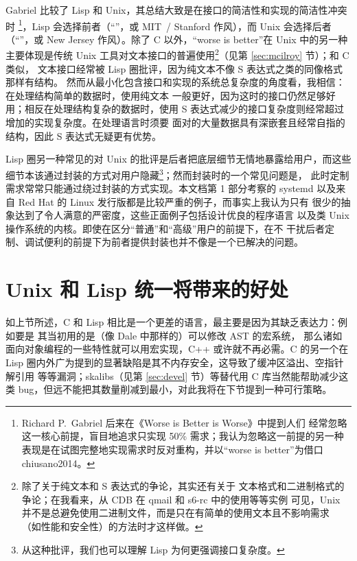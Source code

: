 Gabriel 比较了 Lisp 和 Unix，其总结大致是在接口的简洁性和实现的简洁性冲突时%
\footnote{Richard P.\ Gabriel 后来在《Worse is Better is Worse》中提到人们
经常忽略这一核心前提，盲目地追求只实现 50\% 需求；我认为忽略这一前提的另一种
表现是在试图完整地实现需求时反对重构，并以“worse is better”为借口\cupercite%
{chiusano2014}。}，Lisp 会选择前者（“”，或 MIT~/
Stanford 作风），而 Unix 会选择后者（“”，或 New Jersey
作风）。除了 C 以外，“worse is better”在 Unix 中的另一种主要体现是传统 Unix
工具对文本接口的普遍使用\footnote{除了关于纯文本和 S 表达式的争论，其实还有关于
文本格式和二进制格式的争论；在我看来，从 CDB 在 qmail 和 s6-rc 中的使用等等实例
可见，Unix 并不是总避免使用二进制文件，而是只在有简单的使用文本且不影响需求
（如性能和安全性）的方法时才这样做。}（见第 \ref{sec:mcilroy} 节）；和 C 类似，
文本接口经常被 Lisp 圈批评，因为纯文本不像 S 表达式之类的同像格式那样有结构。
然而从最小化包含接口和实现的系统总复杂度的角度看，我相信：在处理结构简单的数据时，使用纯文本
一般更好，因为这时的接口仍然足够好用；相反在处理结构复杂的数据时，使用
S 表达式减少的接口复杂度则经常超过增加的实现复杂度。在处理语言时须要
面对的大量数据具有深嵌套且经常自指的结构，因此 S 表达式无疑更有优势。

Lisp 圈另一种常见的对 Unix 的批评是后者把底层细节无情地暴露给用户，而这些
细节本该通过封装的方式对用户隐藏\footnote{从这种批评，我们也可以理解 Lisp
为何更强调接口复杂度。}；然而封装时的一个常见问题是，
此时定制需求常常只能通过绕过封装的方式实现。本文档第 1 部分考察的 systemd
以及来自 Red Hat 的 Linux 发行版都是比较严重的例子，而事实上我认为只有
很少的抽象达到了令人满意的严密度，这些正面例子包括设计优良的程序语言
以及类 Unix 操作系统的内核。即使在区分“普通”和“高级”用户的前提下，在不
干扰后者定制、调试便利的前提下为前者提供封装也并不像是一个已解决的问题。

\section{Unix 和 Lisp 统一将带来的好处}\label{sec:benefits}

如上节所述，C 和 Lisp 相比是一个更差的语言，最主要是因为其缺乏表达力：例如要是
其当初用的是（像 Dale 中那样的）可以修改 AST 的宏系统，
那么诸如面向对象编程的一些特性就可以用宏实现，C++ 或许就不再必需。C 的另一个在
Lisp 圈内外广为提到的显著缺陷是其不内存安全，这导致了缓冲区溢出、空指针解引用
等等漏洞；skalibs（见第 \ref{sec:devel} 节）等替代用 C 库当然能帮助减少这类
bug，但远不能把其数量削减到最小，对此我将在下节提到一种可行策略。

